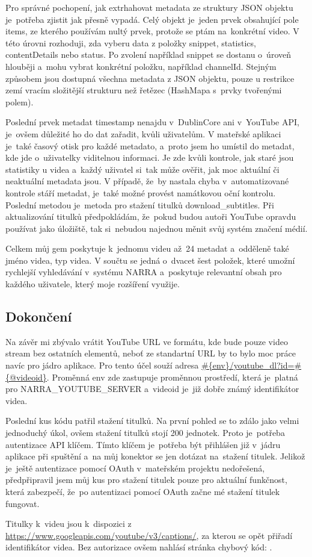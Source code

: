 \par Pro správné pochopení, jak extrhahovat metadata ze struktury JSON objektu je~potřeba zjistit jak přesně vypadá. Celý objekt je~jeden prvek obsahující pole items, ze kterého používám nultý prvek, protože se ptám na~konkrétní video. V této úrovni rozhoduji, zda vyberu data z položky snippet, statistics, contentDetails nebo status. Po zvolení například snippet se dostanu o~úroveň hlouběji a~mohu vybrat konkrétní položku, například channelId. Stejným způsobem jsou dostupná všechna metadata z JSON objektu, pouze u restrikce zemí vracím složitější strukturu než řetězec (HashMapa s~prvky tvořenými polem).
\par Poslední prvek metadat timestamp nenajdu v~DublinCore ani v~YouTube API, je~ovšem důležité ho do dat zařadit, kvůli uživatelům. V mateřské aplikaci je~také časový otisk pro každé metadato, a~proto jsem ho umístil do metadat, kde jde o~uživatelky viditelnou informaci. Je zde kvůli kontrole, jak staré jsou statistiky u videa a~každý uživatel si~tak může ověřit, jak moc aktuální či neaktuální metadata jsou. V případě, že~by nastala chyba v~automatizované kontrole stáří metadat, je~také možné provést namátkovou oční kontrolu. Poslední metodou je~metoda pro stažení titulků download\_subtitles. Při aktualizování titulků předpokládám, že~pokud budou autoři YouTube opravdu používat jako úložiště, tak si~nebudou najednou měnit svůj systém značení médií.
\par Celkem můj gem poskytuje k~jednomu videu až~24 metadat a~odděleně také jméno videa, typ videa. V součtu se jedná o~dvacet šest položek, které umožní rychlejší vyhledávání v~systému NARRA a~poskytuje relevantní obsah pro každého uživatele, který moje rozšíření využije.

\subsection{Dokončení}
\par Na závěr mi zbývalo vrátit YouTube URL ve formátu, kde bude pouze video stream bez ostatních elementů, neboť ze standartní URL by to bylo moc práce navíc pro jádro aplikace. Pro tento účel souží adresa \url{#{env}/youtube_dl?id=#{@videoid}}. Proměnná env zde zastupuje proměnnou prostředí, která je~platná pro NARRA\_YOUTUBE\_SERVER a~videoid je~již dobře známý identifikátor videa.
\par Poslední kus kódu patřil stažení titulků. Na první pohled se to zdálo jako velmi jednoduchý úkol, ovšem stažení titulků stojí 200 jednotek. Proto je~potřeba autentizace API klíčem. Tímto klíčem je~potřeba být přihlášen již v~jádru aplikace při spuštění a~na můj konektor se jen dotázat na~stažení titulek. Jelikož je~ještě autentizace pomocí OAuth v~mateřském projektu nedořešená, předpřipravil jsem můj kus pro stažení titulek pouze pro aktuální funkčnost, která zabezpečí, že~po autentizaci pomocí OAuth začne mé stažení titulek fungovat.
\par Titulky k~videu jsou k~dispozici z \url{https://www.googleapis.com/youtube/v3/captions/}, za kterou se opět přiřadí identifikátor videa. Bez autorizace ovšem nahlásí stránka chybový kód: .